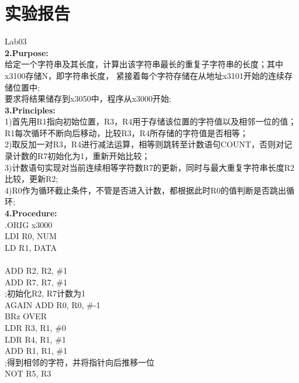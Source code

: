 \documentclass[12pt]{ctexart}
\begin{document}
\section*{实验报告}
Lab03\\
{\bf2.Purpose:}\\
给定一个字符串及其长度，计算出该字符串最长的重复子字符串的长度；其中x3100存储N，即字符串长度，
紧接着每个字符存储在从地址x3101开始的连续存储位置中;\\
要求将结果储存到x3050中，程序从x3000开始;\\
{\bf3.Principles:}\\
1)首先用R1指向初始位置，R3，R4用于存储该位置的字符值以及相邻一位的值；R1每次循环不断向后移动，比较R3，R4所存储的字符值是否相等；\\
2)取反加一对R3，R4进行减法运算，相等则跳转至计数语句COUNT，否则对记录计数的R7初始化为1，重新开始比较；\\
3)计数语句实现对当前连续相等字符数R7的更新，同时与最大重复字符串长度R2比较，更新R2;\\
4)R0作为循环截止条件，不管是否进入计数，都根据此时R0的值判断是否跳出循环;\\
{\bf4.Procedure:}\\
.ORIG x3000\\
\hspace*{1.5cm}LDI R0, NUM\\
\hspace*{1.5cm}LD R1, DATA\\
\\
\hspace*{1.5cm}ADD R2, R2, \#1\\
\hspace*{1.5cm}ADD R7, R7, \#1\\
\hspace*{1.5cm};初始化R2, R7计数为1\\
AGAIN   ADD R0, R0, \#-1\\
\hspace*{1.5cm}BRz OVER\\
\hspace*{1.5cm}LDR R3, R1, \#0\\
\hspace*{1.5cm}LDR R4, R1, \#1\\
\hspace*{1.5cm}ADD R1, R1, \#1\\
\hspace*{1.5cm};得到相邻的字符，并将指针向后推移一位\\
\hspace*{1.5cm}NOT R5, R3\\
\end{document}
